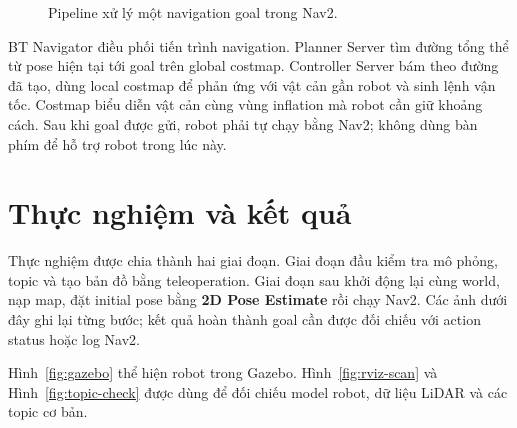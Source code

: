 \documentclass[12pt,a4paper]{article}
\begin{document}
\begin{figure}[htbp]
  \centering
  \caption{Pipeline xử lý một navigation goal trong Nav2.}
  \label{fig:nav2-flow}
\end{figure}

BT Navigator điều phối tiến trình navigation. Planner Server tìm đường tổng thể
từ pose hiện tại tới goal trên global costmap. Controller Server bám theo đường
đã tạo, dùng local costmap để phản ứng với vật cản gần robot và sinh lệnh vận
tốc. Costmap biểu diễn vật cản cùng vùng inflation mà robot cần giữ khoảng cách.
Sau khi goal được gửi, robot phải tự chạy bằng Nav2; không dùng bàn phím để hỗ
trợ robot trong lúc này.

\section{Thực nghiệm và kết quả}

Thực nghiệm được chia thành hai giai đoạn. Giai đoạn đầu kiểm tra mô phỏng,
topic và tạo bản đồ bằng teleoperation. Giai đoạn sau khởi động lại cùng world,
nạp map, đặt initial pose bằng \textbf{2D Pose Estimate} rồi chạy Nav2. Các ảnh
dưới đây ghi lại từng bước; kết quả hoàn thành goal cần được đối chiếu với
action status hoặc log Nav2.

Hình~\ref{fig:gazebo} thể hiện robot trong Gazebo.
Hình~\ref{fig:rviz-scan} và Hình~\ref{fig:topic-check} được dùng để đối chiếu
model robot, dữ liệu LiDAR và các topic cơ bản.
\end{document}
